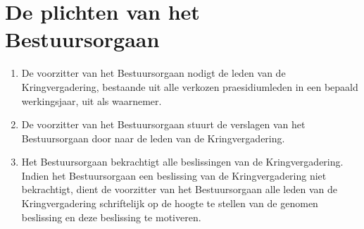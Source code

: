 \section{De plichten van het Bestuursorgaan}
    \begin{enumerate}
    \item De voorzitter van het Bestuursorgaan nodigt de leden van de Kringvergadering, bestaande uit alle verkozen praesidiumleden in een bepaald werkingsjaar, uit als waarnemer.
    \item De voorzitter van het Bestuursorgaan stuurt de verslagen van het Bestuursorgaan door naar de leden van de Kringvergadering.
    \item Het Bestuursorgaan bekrachtigt alle beslissingen van de Kringvergadering. Indien het Bestuursorgaan een beslissing van de Kringvergadering niet bekrachtigt, dient de voorzitter van het Bestuursorgaan alle leden van de Kringvergadering schriftelijk op de hoogte te stellen van de genomen beslissing en deze beslissing te motiveren.
    \end{enumerate}

